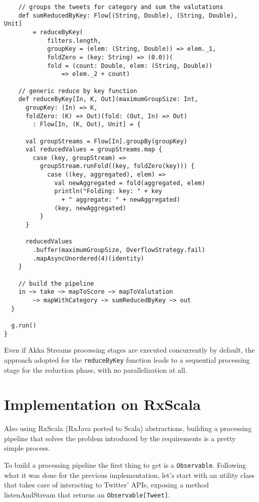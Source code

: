 \begin{verbatim}
    // groups the tweets for category and sum the valutations
    def sumReducedByKey: Flow[(String, Double), (String, Double), Unit]
        = reduceByKey(
            filters.length,
            groupKey = (elem: (String, Double)) => elem._1,
            foldZero = (key: String) => (0.0))(
            fold = (count: Double, elem: (String, Double)) 
            	=> elem._2 + count)

    // generic reduce by key function
    def reduceByKey[In, K, Out](maximumGroupSize: Int,
      groupKey: (In) => K,
      foldZero: (K) => Out)(fold: (Out, In) => Out)
        : Flow[In, (K, Out), Unit] = {

      val groupStreams = Flow[In].groupBy(groupKey)
      val reducedValues = groupStreams.map {
        case (key, groupStream) =>
          groupStream.runFold((key, foldZero(key))) {
            case ((key, aggregated), elem) =>
              val newAggregated = fold(aggregated, elem)
              println("Folding: key: " + key
                + " aggregate: " + newAggregated)
              (key, newAggregated)
          }
      }

      reducedValues
        .buffer(maximumGroupSize, OverflowStrategy.fail)
        .mapAsyncUnordered(4)(identity)
    }

    // build the pipeline
    in ~> take ~> mapToScore ~> mapToValutation
        ~> mapWithCategory ~> sumReducedByKey ~> out
  }

  g.run()
}
\end{verbatim}

Even if Akka Streams processing stages are executed concurrently by
default, the approach adopted for the \texttt{reduceByKey} function
leads to a sequential processing stage for the reduction phase, with no
parallelization at all.

\section{Implementation on RxScala}\label{implementation-on-rxscala}

Also using RxScala (RxJava ported to Scala) abstractions, building a
processing pipeline that solves the problem introduced by the
requirements is a pretty simple process.

To build a processing pipeline the first thing to get is a
\texttt{Observable}. Following what it was done for the previous
implementation, let's start with an utility class that takes care of
interacting to Twitter' APIs, exposing a method listenAndStream that
returns an \texttt{Observable{[}Tweet{]}}.


